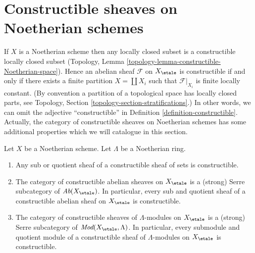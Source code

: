 \section{Constructible sheaves on Noetherian schemes}
\label{section-noetherian-constructible}

\noindent
If $X$ is a Noetherian scheme then any locally closed subset is a
constructible locally closed subset
(Topology, Lemma \ref{topology-lemma-constructible-Noetherian-space}).
Hence an abelian sheaf $\mathcal{F}$ on $X_\etale$ is constructible
if and only if there exists a finite partition $X = \coprod X_i$
such that $\mathcal{F}|_{X_i}$ is finite locally constant.
(By convention a partition of a topological space has locally
closed parts, see Topology, Section \ref{topology-section-stratifications}.)
In other words, we can omit the adjective ``constructible'' in
Definition \ref{definition-constructible}. Actually, the category
of constructible sheaves on
Noetherian schemes has some additional properties which we will
catalogue in this section.

\begin{proposition}
\label{proposition-constructible-over-noetherian}
Let $X$ be a Noetherian scheme. Let $\Lambda$ be a Noetherian ring.
\begin{enumerate}
\item Any sub or quotient sheaf of a constructible sheaf of sets
is constructible.
\item The category of constructible abelian sheaves on $X_\etale$ is a
(strong) Serre subcategory of $\textit{Ab}(X_\etale)$. In particular,
every sub and quotient sheaf of a constructible abelian sheaf
on $X_\etale$ is constructible.
\item The category of constructible sheaves of $\Lambda$-modules
on $X_\etale$ is a (strong) Serre subcategory of
$\textit{Mod}(X_\etale, \Lambda)$. In particular, every submodule
and quotient module of a constructible sheaf of $\Lambda$-modules
on $X_\etale$ is constructible.
\end{enumerate}
\end{proposition}

